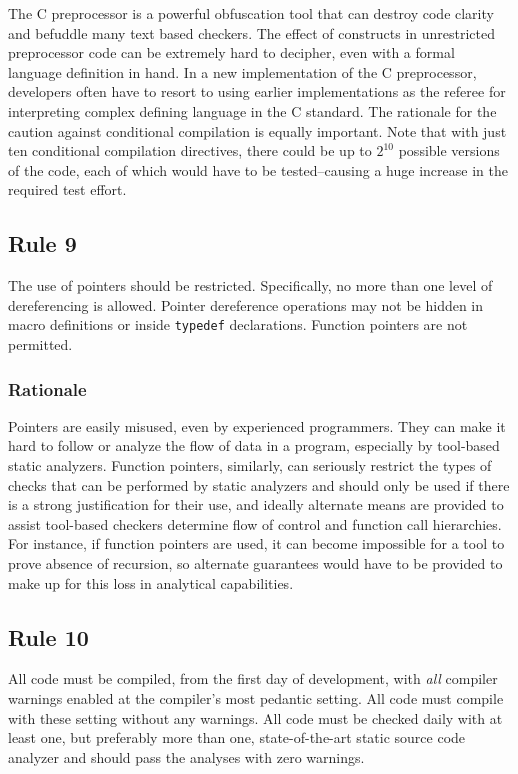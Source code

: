 \documentclass[11pt,oneside]{article}
\begin{document}
The C preprocessor is a powerful obfuscation tool that can destroy code clarity
and befuddle many text based checkers.  The effect of constructs in
unrestricted preprocessor code can be extremely hard to decipher, even with a
formal language definition in hand. In a new implementation of the C
preprocessor, developers often have to resort to using earlier implementations
as the referee for interpreting complex defining language in the C standard.
The rationale for the caution against conditional compilation is equally
important. Note that with just ten conditional compilation directives, there
could be up to $2^{10}$ possible versions of the code, each of which would have
to be tested--causing a huge increase in the required test effort.

\subsection{Rule 9}

The use of pointers should be restricted.
Specifically, no more than one level of dereferencing is allowed.
Pointer dereference operations may not be hidden in macro definitions
or inside \texttt{typedef} declarations. Function pointers are not
permitted.

\subsubsection*{Rationale}

Pointers are easily misused, even by experienced programmers. They can make it
hard to follow or analyze the flow of data in a program, especially by
tool-based static analyzers.  Function pointers, similarly, can seriously
restrict the types of checks that can be performed by static analyzers and
should only be used if there is a strong justification for their use, and
ideally alternate means are provided to assist tool-based checkers determine
flow of control and function call hierarchies. For instance, if function
pointers are used, it can become impossible for a tool to prove absence of
recursion, so alternate guarantees would have to be provided to make up for
this loss in analytical capabilities.


\subsection{Rule 10}

All code must be compiled, from the first day of development, with \emph{all}
compiler warnings enabled at the compiler’s most pedantic setting. All code
must compile with these setting without any warnings. All code must be checked
daily with at least one, but preferably more than one, state-of-the-art static
source code analyzer and should pass the analyses with zero warnings.
\end{document}
